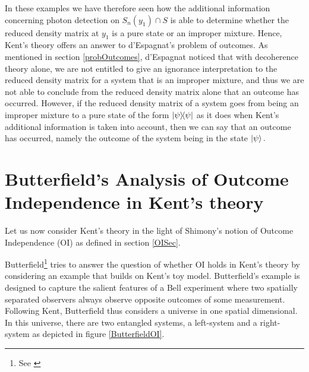 In these examples we have therefore seen how the additional information concerning photon detection on $S_n(y_1)\cap S$ is able to determine whether the reduced density matrix at $y_1$ is a pure state or an improper mixture. Hence, Kent's theory offers an answer to d'Espagnat's problem of outcomes. As mentioned in section \ref{probOutcomes}, d'Espagnat noticed that with decoherence theory alone, we are not entitled to give an ignorance interpretation to the reduced density matrix for a system that is an improper mixture, and thus we are not able to conclude from the reduced density matrix alone that an outcome has occurred. However, if the reduced density matrix of a system goes from being an improper mixture to a pure state of the form $\dyad{\psi}$ as it does when Kent's additional information is taken into account, then we can say that an outcome has occurred, namely the outcome of the system being in the state $\ket{\psi}.$  




\section{Butterfield's Analysis of Outcome Independence  in Kent's theory}
Let us now consider Kent's theory in the light of Shimony's notion of Outcome Independence (OI)  as defined in section \ref{OISec}. 

Butterfield\footnote{See \cite[30-32]{Butterfield}} tries to answer the question of whether OI holds in Kent's theory by considering an example that builds on Kent's toy model. Butterfield's example is designed to capture the salient features of a Bell experiment where two spatially separated observers always observe opposite outcomes of some measurement. Following Kent, Butterfield thus considers a universe in one spatial dimensional. In this universe, there are two entangled systems, a left-system and a right-system as depicted in figure \ref{ButterfieldOI}.

